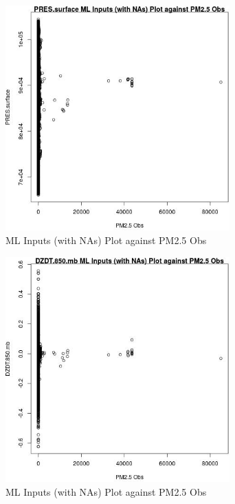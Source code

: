 \begin{figure} 
\centering  
\includegraphics[width=0.77\textwidth]{Code_Outputs/Report_ML_input_PM25_Step4_part_f_de_duplicated_aves_prioritize_24hr_obswNAs_PRESsurfacevPM25_Obs.jpg} 
\caption{\label{fig:Report_ML_input_PM25_Step4_part_f_de_duplicated_aves_prioritize_24hr_obswNAsPRESsurfacevPM25_Obs}ML Inputs (with NAs) Plot against PM2.5 Obs} 
\end{figure} 
 

\begin{figure} 
\centering  
\includegraphics[width=0.77\textwidth]{Code_Outputs/Report_ML_input_PM25_Step4_part_f_de_duplicated_aves_prioritize_24hr_obswNAs_DZDT850mbvPM25_Obs.jpg} 
\caption{\label{fig:Report_ML_input_PM25_Step4_part_f_de_duplicated_aves_prioritize_24hr_obswNAsDZDT850mbvPM25_Obs}ML Inputs (with NAs) Plot against PM2.5 Obs} 
\end{figure} 
 

